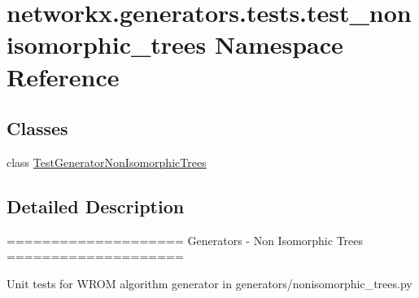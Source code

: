 \hypertarget{namespacenetworkx_1_1generators_1_1tests_1_1test__nonisomorphic__trees}{}\section{networkx.\+generators.\+tests.\+test\+\_\+nonisomorphic\+\_\+trees Namespace Reference}
\label{namespacenetworkx_1_1generators_1_1tests_1_1test__nonisomorphic__trees}
\subsection*{Classes}
\begin{DoxyCompactItemize}
\item 
class \hyperlink{classnetworkx_1_1generators_1_1tests_1_1test__nonisomorphic__trees_1_1TestGeneratorNonIsomorphicTrees}{Test\+Generator\+Non\+Isomorphic\+Trees}
\end{DoxyCompactItemize}


\subsection{Detailed Description}
\begin{DoxyVerb}====================
Generators - Non Isomorphic Trees
====================

Unit tests for WROM algorithm generator in generators/nonisomorphic_trees.py
\end{DoxyVerb}
 